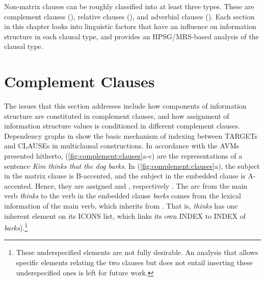 Non-matrix clauses can be roughly classified into at least three
types.  These are complement clauses (),
relative clauses (), and adverbial clauses
().  Each section in this chapter
looks into linguistic factors that have an influence
on information structure in each clausal type,
and provides an HPSG/MRS-based analysis of the clausal type.










\section{Complement Clauses}
\label{10:ssec:embedded}


The issues that this section addresses include how components of
information structure are constituted in complement
clauses, and how assignment of information
structure values is conditioned in different complement clauses.
Dependency graphs in  show the basic
mechanism of indexing between TARGETs and CLAUSEs in multiclausal
constructions. In accordance with the AVMs
presented hitherto, (\ref{fig:complement:clauses}a-c) are the
representations of a sentence \textit{Kim thinks that the dog
  barks}. In (\ref{fig:complement:clauses}a), the subject in the
matrix clause is B-accented, and the subject in the embedded clause is
A-accented. Hence, they are assigned
 and ,
respectively . The arc from the main verb
\textit{thinks} to the verb in the embedded clause \textit{barks}
comes from the lexical information of the main verb, which inherits
from . That is, \textit{thinks} has one
inherent element on its ICONS list, which links its own INDEX to INDEX
of \textit{barks}).\footnote{These underspecified 
  elements are not fully desirable. An analysis
  that allows specific  elements relating the two clauses
  but does not entail inserting these underspecified ones is left for
  future work.}





